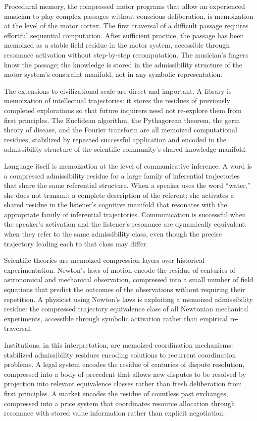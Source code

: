 \documentclass[12pt, a4paper, openany]{book}
\theoremstyle{plain}
\theoremstyle{definition}
\theoremstyle{remark}
\begin{document}
Procedural memory, the compressed motor programs that allow an experienced musician to play complex passages without conscious deliberation, is memoization at the level of the motor cortex. The first traversal of a difficult passage requires effortful sequential computation. After sufficient practice, the passage has been memoized as a stable field residue in the motor system, accessible through resonance activation without step-by-step recomputation. The musician's fingers know the passage; the knowledge is stored in the admissibility structure of the motor system's constraint manifold, not in any symbolic representation.

The extensions to civilizational scale are direct and important. A library is memoization of intellectual trajectories: it stores the residues of previously completed explorations so that future inquirers need not re-explore them from first principles. The Euclidean algorithm, the Pythagorean theorem, the germ theory of disease, and the Fourier transform are all memoized computational residues, stabilized by repeated successful application and encoded in the admissibility structure of the scientific community's shared knowledge manifold.

Language itself is memoization at the level of communicative inference. A word is a compressed admissibility residue for a large family of inferential trajectories that share the same referential structure. When a speaker uses the word ``water,'' she does not transmit a complete description of the referent; she activates a shared residue in the listener's cognitive manifold that resonates with the appropriate family of inferential trajectories. Communication is successful when the speaker's activation and the listener's resonance are dynamically equivalent: when they refer to the same admissibility class, even though the precise trajectory leading each to that class may differ.

Scientific theories are memoized compression layers over historical experimentation. Newton's laws of motion encode the residue of centuries of astronomical and mechanical observation, compressed into a small number of field equations that predict the outcomes of the observations without requiring their repetition. A physicist using Newton's laws is exploiting a memoized admissibility residue: the compressed trajectory equivalence class of all Newtonian mechanical experiments, accessible through symbolic activation rather than empirical re-traversal.

Institutions, in this interpretation, are memoized coordination mechanisms: stabilized admissibility residues encoding solutions to recurrent coordination problems. A legal system encodes the residue of centuries of dispute resolution, compressed into a body of precedent that allows new disputes to be resolved by projection into relevant equivalence classes rather than fresh deliberation from first principles. A market encodes the residue of countless past exchanges, compressed into a price system that coordinates resource allocation through resonance with stored value information rather than explicit negotiation.
\end{document}
